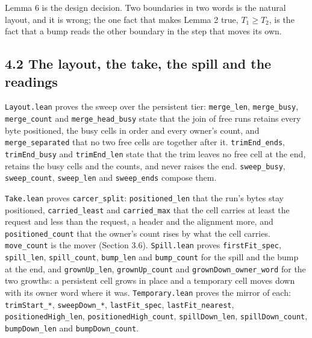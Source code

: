 Lemma 6 is the design decision. Two boundaries in two words is the natural layout, and it is wrong; the one fact that makes Lemma 2 true, \(T_1 \ge T_2\), is the fact that a bump reads the other boundary in the step that moves its own.

\subsection{\texorpdfstring{4.2 The layout, the take, the spill and the readings}{4.2 The layout, the take, the spill and the readings}}

\texttt{Layout.\allowbreak{}lean} proves the sweep over the persistent tier: \texttt{merge\_\allowbreak{}len}, \texttt{merge\_\allowbreak{}busy}, \texttt{merge\_\allowbreak{}count} and \texttt{merge\_\allowbreak{}head\_\allowbreak{}busy} state that the join of free runs retains every byte positioned, the busy cells in order and every owner's count, and \texttt{merge\_\allowbreak{}separated} that no two free cells are together after it. \texttt{trim\allowbreak{}End\_\allowbreak{}ends}, \texttt{trim\allowbreak{}End\_\allowbreak{}busy} and \texttt{trim\allowbreak{}End\_\allowbreak{}len} state that the trim leaves no free cell at the end, retains the busy cells and the counts, and never raises the end. \texttt{sweep\_\allowbreak{}busy}, \texttt{sweep\_\allowbreak{}count}, \texttt{sweep\_\allowbreak{}len} and \texttt{sweep\_\allowbreak{}ends} compose them.

\texttt{Take.\allowbreak{}lean} proves \texttt{carcer\_\allowbreak{}split}: \texttt{positioned\_\allowbreak{}len} that the run's bytes stay positioned, \texttt{carried\_\allowbreak{}least} and \texttt{carried\_\allowbreak{}max} that the cell carries at least the request and less than the request, a header and the alignment more, and \texttt{positioned\_\allowbreak{}count} that the owner's count rises by what the cell carries. \texttt{move\_\allowbreak{}count} is the mover (Section 3.6). \texttt{Spill.\allowbreak{}lean} proves \texttt{first\allowbreak{}Fit\_\allowbreak{}spec}, \texttt{spill\_\allowbreak{}len}, \texttt{spill\_\allowbreak{}count}, \texttt{bump\_\allowbreak{}len} and \texttt{bump\_\allowbreak{}count} for the spill and the bump at the end, and \texttt{grown\allowbreak{}Up\_\allowbreak{}len}, \texttt{grown\allowbreak{}Up\_\allowbreak{}count} and \texttt{grown\allowbreak{}Down\_\allowbreak{}owner\_\allowbreak{}word} for the two growths: a persistent cell grows in place and a temporary cell moves down with its owner word where it was. \texttt{Temporary.\allowbreak{}lean} proves the mirror of each: \texttt{trim\allowbreak{}Start\_\allowbreak{}*}, \texttt{sweep\allowbreak{}Down\_\allowbreak{}*}, \texttt{last\allowbreak{}Fit\_\allowbreak{}spec}, \texttt{last\allowbreak{}Fit\_\allowbreak{}nearest}, \texttt{positioned\allowbreak{}High\_\allowbreak{}len}, \texttt{positioned\allowbreak{}High\_\allowbreak{}count}, \texttt{spill\allowbreak{}Down\_\allowbreak{}len}, \texttt{spill\allowbreak{}Down\_\allowbreak{}count}, \texttt{bump\allowbreak{}Down\_\allowbreak{}len} and \texttt{bump\allowbreak{}Down\_\allowbreak{}count}.

